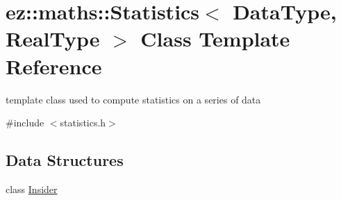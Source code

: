 \hypertarget{classez_1_1maths_1_1Statistics}{}\section{ez\+:\+:maths\+:\+:Statistics$<$ Data\+Type, Real\+Type $>$ Class Template Reference}
\label{classez_1_1maths_1_1Statistics}


template class used to compute statistics on a series of data  




{\ttfamily \#include $<$statistics.\+h$>$}

\subsection*{Data Structures}
\begin{DoxyCompactItemize}
\item 
class \hyperlink{classez_1_1maths_1_1Statistics_1_1Insider}{Insider}
\end{DoxyCompactItemize}
